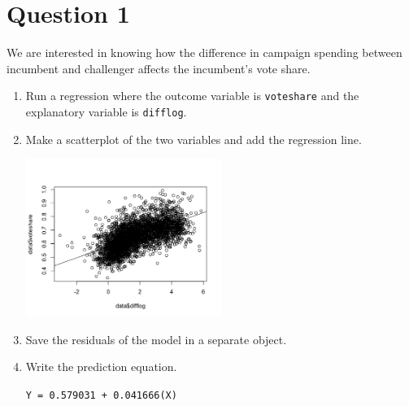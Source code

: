 \documentclass[12pt,letterpaper]{article}
\begin{document}
\section*{Question 1}
\vspace{.25cm}
\noindent We are interested in knowing how the difference in campaign spending between incumbent and challenger affects the incumbent's vote share. 
	\begin{enumerate}
		\item Run a regression where the outcome variable is \texttt{voteshare} and the explanatory variable is \texttt{difflog}.
			\vspace{5cm}
		\item Make a scatterplot of the two variables and add the regression line. 
		
		\vspace{1cm}
		\includegraphics[width=0.5\textwidth]{Q1_Rplot.png}
		\vspace{2cm}
		\item Save the residuals of the model in a separate object.
				\vspace{5cm}
		\item Write the prediction equation.\vspace{1cm}
		
		\texttt{Y = 0.579031 + 0.041666(X)}
	\end{enumerate}
	
\newpage
\end{document}

